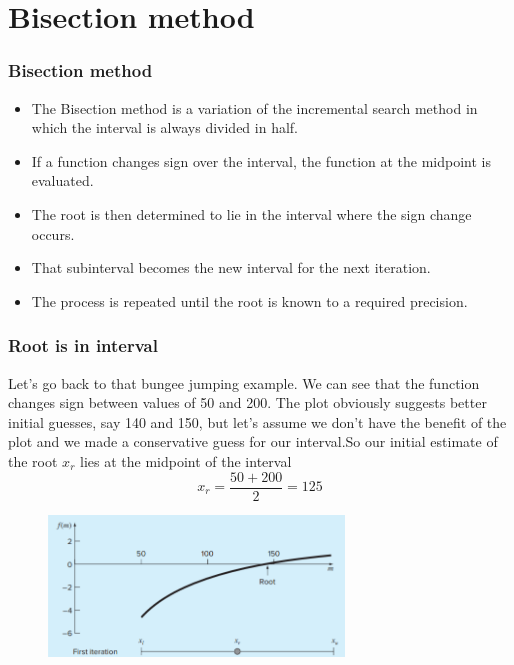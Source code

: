 \documentclass{if-beamer}
\begin{document}
\section{Bisection method}

\begin{frame}
\frametitle{Bisection method}
\begin{itemize}
	\item The Bisection method is a variation of the incremental search method in which the interval is always divided in half. \\
	\item If a function changes sign over the interval, the function at the midpoint is evaluated. \\
	\item The root is then determined to lie in the interval where the sign change occurs.\\
	\item That subinterval becomes the new interval for the next iteration.
	\item The process is repeated until the root is known to a required precision.
\end{itemize}
\end{frame}


\begin{frame}
\frametitle{Root is in interval}
Let's go back to that bungee jumping example. We can see that the function changes sign between values of 50 and 200. The plot obviously suggests better initial guesses, say 140 and 150, but let’s assume we don’t have the benefit of the plot and we made a conservative guess for our interval.So our initial estimate of the root $x_r$ lies at the midpoint of the interval
$$ x_r = \frac{50+200}{2} = 125 $$
\begin{figure}
\center
\includegraphics[width=0.7\textwidth]{figures/bracket.png}
\end{figure}
\end{frame}
\end{document}
